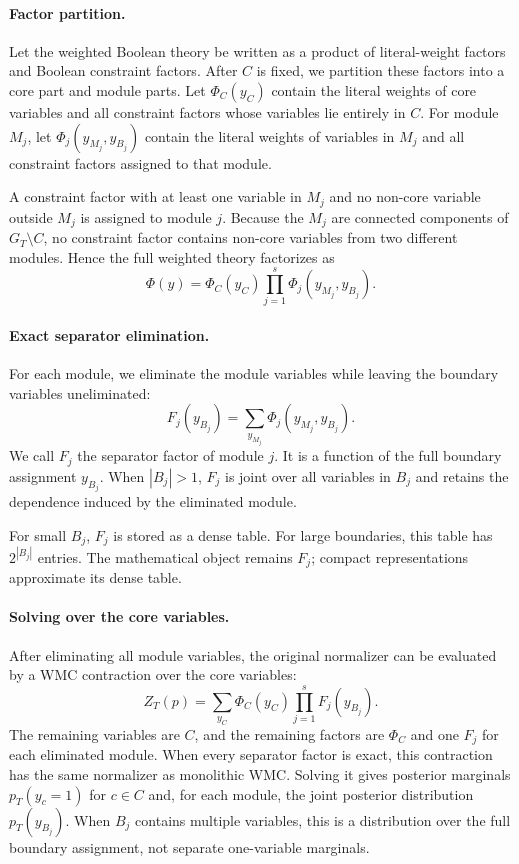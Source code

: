 \documentclass[letterpaper]{article}
\begin{document}
\paragraph{Factor partition.}
Let the weighted Boolean theory be written as a product of literal-weight
factors and Boolean constraint factors. After \(C\) is fixed, we partition
these factors into a core part and module parts. Let
\(\Phi_C(y_C)\) contain the literal weights of core variables and all
constraint factors whose variables lie entirely in \(C\). For module
\(M_j\), let \(\Phi_j(y_{M_j},y_{B_j})\) contain the literal weights of
variables in \(M_j\) and all constraint factors assigned to that module.

A constraint factor with at least one variable in \(M_j\) and no
non-core variable outside \(M_j\) is assigned to module \(j\). Because the
\(M_j\) are connected components of \(G_T\setminus C\), no constraint
factor contains non-core variables from two different modules. Hence the
full weighted theory factorizes as
\[
\Phi(y)
=
\Phi_C(y_C)
\prod_{j=1}^{s}
\Phi_j(y_{M_j},y_{B_j}).
\]

\paragraph{Exact separator elimination.}
For each module, we eliminate the module variables while leaving the
boundary variables uneliminated:
\[
F_j(y_{B_j})
=
\sum_{y_{M_j}}
\Phi_j(y_{M_j},y_{B_j}).
\]
We call \(F_j\) the separator factor of module \(j\). It is a function of
the full boundary assignment \(y_{B_j}\). When \(|B_j|>1\), \(F_j\) is
joint over all variables in \(B_j\) and retains the dependence induced by
the eliminated module.

For small \(B_j\), \(F_j\) is stored as a dense table. For large
boundaries, this table has \(2^{|B_j|}\) entries. The mathematical object
remains \(F_j\); compact representations approximate its dense table.

\paragraph{Solving over the core variables.}
After eliminating all module variables, the original normalizer can be
evaluated by a WMC contraction over the core variables:
\[
Z_T(p)
=
\sum_{y_C}
\Phi_C(y_C)
\prod_{j=1}^{s}
F_j(y_{B_j}).
\]
The remaining variables are \(C\), and the remaining factors are
\(\Phi_C\) and one \(F_j\) for each eliminated module. When every
separator factor is exact, this contraction has the same normalizer as
monolithic WMC. Solving it gives posterior marginals
\(p_T(y_c=1)\) for \(c\in C\) and, for each module, the joint posterior
distribution \(p_T(y_{B_j})\). When \(B_j\) contains multiple variables,
this is a distribution over the full boundary assignment, not separate
one-variable marginals.
\end{document}
